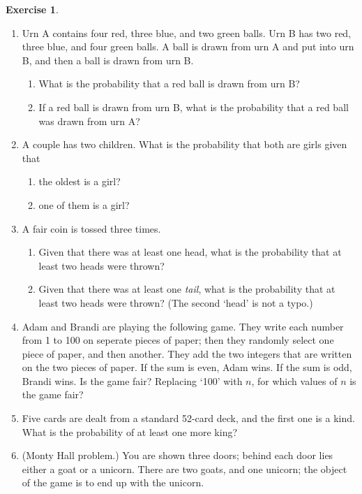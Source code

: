 \documentclass[a4paper,leqno]{article}
\numberwithin{equation}{section}
\theoremstyle{definition}
\newtheorem{exercise}[equation]{Exercise}
\theoremstyle{remark}
\begin{document}
\begin{exercise}\leavevmode
  \begin{enumerate}
    \item Urn A contains four red, three blue, and two green balls. Urn B has two red, three blue,
          and four green balls. A ball is drawn from urn A and put into urn B, and then a ball is
          drawn from urn B.
      \begin{enumerate}
        \item What is the probability that a red ball is drawn from urn B?
        \item If a red ball is drawn from urn B, what is the probability that
              a red ball was drawn from urn A?
      \end{enumerate}
    \item A couple has two children. What is the probability that both are girls given that
      \begin{enumerate}
        \item the oldest is a girl?
        \item one of them is a girl?
      \end{enumerate}
    \item A fair coin is tossed three times.
      \begin{enumerate}
        \item Given that there was at least one head, what is the probability that at least two heads were thrown?
        \item Given that there was at least one \emph{tail}, what is the probability that at least two heads were thrown? (The second `head' is not a typo.)
      \end{enumerate}
    \item Adam and Brandi are playing the following game. They write each number from 1 to 100 on seperate pieces of paper;
          then they randomly select one piece of paper, and then another. They add the two integers that are written on the
          two pieces of paper. If the sum is even, Adam wins. If the sum is odd, Brandi wins. Is the game fair? Replacing `100'
          with $ n $, for which values of $ n $ is the game fair?
    \item Five cards are dealt from a standard 52-card deck, and the first one is a kind. What is the probability
          of at least one more king?
    \item (Monty Hall problem.) You are shown three doors; behind each door lies either a goat or a unicorn. There are two goats, and one unicorn;
          the object of the game is to end up with the unicorn.


\end{enumerate}
\end{exercise}
\end{document}
